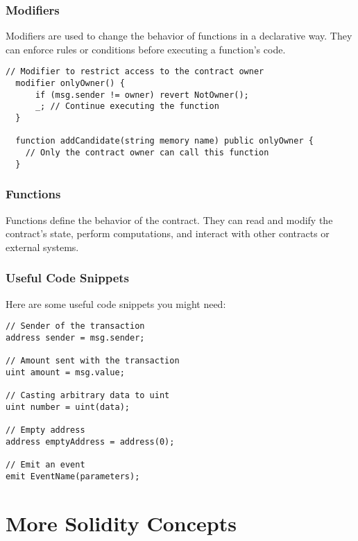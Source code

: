 \documentclass[12pt]{article}
\begin{document}
\subsubsection*{Modifiers}

Modifiers are used to change the behavior of functions in a declarative way. They can enforce rules or conditions before executing a function's code.

\noindent
\begin{minipage}[c]{\textwidth}
\begin{lstlisting}[language=Solidity]
  // Modifier to restrict access to the contract owner
  modifier onlyOwner() {
      if (msg.sender != owner) revert NotOwner();
      _; // Continue executing the function
  }

  function addCandidate(string memory name) public onlyOwner {
    // Only the contract owner can call this function
  }
\end{lstlisting}
\end{minipage}

\subsubsection*{Functions}

Functions define the behavior of the contract. They can read and modify the contract's state, perform computations, and interact with other contracts or external systems.

\subsubsection*{Useful Code Snippets}
Here are some useful code snippets you might need:

\noindent
\begin{minipage}[c]{\textwidth}
\begin{lstlisting}[language=Solidity]
// Sender of the transaction
address sender = msg.sender;

// Amount sent with the transaction
uint amount = msg.value;

// Casting arbitrary data to uint
uint number = uint(data);

// Empty address
address emptyAddress = address(0);

// Emit an event
emit EventName(parameters);
\end{lstlisting}
\end{minipage}

\pagebreak
\section{More Solidity Concepts}
\end{document}
